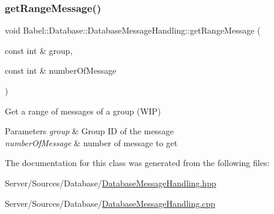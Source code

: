 \subsubsection{\texorpdfstring{get\+Range\+Message()}{getRangeMessage()}}
{\footnotesize\ttfamily void Babel\+::\+Database\+::\+Database\+Message\+Handling\+::get\+Range\+Message (\begin{DoxyParamCaption}\item[{const int \&}]{group,  }\item[{const int \&}]{number\+Of\+Message }\end{DoxyParamCaption})}

Get a range of messages of a group (W\+IP) 
\begin{DoxyParams}{Parameters}
{\em group} & Group ID of the message \\
\hline
{\em number\+Of\+Message} & number of message to get \\
\hline
\end{DoxyParams}


The documentation for this class was generated from the following files\+:\begin{DoxyCompactItemize}
\item 
Server/\+Sources/\+Database/\hyperlink{DatabaseMessageHandling_8hpp}{Database\+Message\+Handling.\+hpp}\item 
Server/\+Sources/\+Database/\hyperlink{DatabaseMessageHandling_8cpp}{Database\+Message\+Handling.\+cpp}\end{DoxyCompactItemize}
